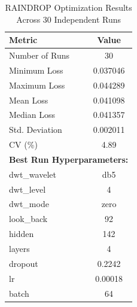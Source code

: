 \begin{table}[htbp]
\centering
\caption{RAINDROP Optimization Results Across 30 Independent Runs}
\label{tab:raindrop_results}
\begin{tabular}{lc}
\hline
\textbf{Metric} & \textbf{Value} \\
\hline
Number of Runs & 30 \\
Minimum Loss   & 0.037046 \\
Maximum Loss   & 0.044289 \\
Mean Loss      & 0.041098 \\
Median Loss    & 0.041357 \\
Std. Deviation & 0.002011 \\
CV (\%)       & 4.89 \\
\hline
\multicolumn{2}{l}{\textbf{Best Run Hyperparameters:}} \\
dwt\_wavelet   & db5 \\
dwt\_level     & 4 \\
dwt\_mode      & zero \\
look\_back     & 92 \\
hidden         & 142 \\
layers         & 4 \\
dropout        & 0.2242 \\
lr             & 0.00018 \\
batch          & 64 \\
\hline
\end{tabular}
\end{table}

